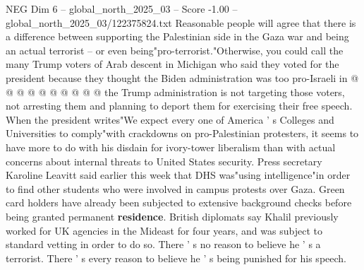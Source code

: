 \begin{textsample}{NEG Dim 6 – global\_north\_2025\_03 – Score -1.00 – global\_north\_2025\_03/122375824.txt}
Reasonable people will agree that there is a difference between supporting the Palestinian side in the Gaza war and being an actual terrorist -- or even being"pro-terrorist."Otherwise, you could call the many Trump voters of Arab descent in Michigan who said they voted for the president because they thought the Biden administration was too pro-Israeli in @ @ @ @ @ @ @ @ @ @ the Trump administration is not targeting those voters, not arresting them and planning to deport them for exercising their free speech.
When the president writes"We expect every one of America ' s Colleges and Universities to comply"with crackdowns on pro-Palestinian protesters, it seems to have more to do with his disdain for ivory-tower liberalism than with actual concerns about internal threats to United States security.
Press secretary Karoline Leavitt said earlier this week that DHS was"using intelligence"in order to find other students who were involved in campus protests over Gaza.
Green card holders have already been subjected to extensive background checks before being granted permanent \textbf{residence}.
British diplomats say Khalil previously worked for UK agencies in the Mideast for four years, and was subject to standard vetting in order to do so.
There ' s no reason to believe he ' s a terrorist.
There ' s every reason to believe he ' s being punished for his speech.

\end{textsample}
